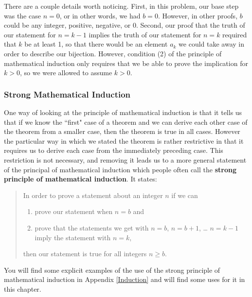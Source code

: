 There are a couple details worth noticing.  First, in this problem, our
base step was the case $n=0$, or in other words, we had $b=0$.  However,
in other proofs,
$b$ could be any integer, positive, negative, or 0.  Second, our proof
that the truth of our statement for $n=k-1$ implies the truth of our
statement for
$n=k$ required that $k$ be at least 1, so that there would be an element
$a_k$ we could take away in order to describe our bijection.  However,
condition (2) of the principle of mathematical induction only requires
that we be able to prove the implication for $k>0$, so we were allowed to
assume $k>0$.

\subsubsection{Strong Mathematical Induction}
One way of looking at the principle of mathematical induction is that it
tells us that if we know the ``first" case of a theorem and we can derive
each other case of the theorem from a smaller case, then the theorem is
true in all cases.  However the particular way in which we stated the
theorem is rather restrictive in that it requires us to derive each
case from the immediately preceding case.  This restriction is
not necessary, and removing it leads us to a more general statement of
the principal of mathematical induction which people often call the {\bf
strong principle of mathematical induction}.  It states:
\begin{quote}In order to prove a
statement about an integer $n$ if we can
\begin{enumerate}
\item prove our statement when $n=b$ and
\item prove that the statements we get with $n=b$, $n=b+1$, \ldots
$n=k-1$ imply the statement with $n=k$,
\end{enumerate}
then our statement is true for all integers $n\ge b$.
\end{quote}
You will find some explicit examples of the use of the strong principle of
mathematical induction in Appendix \ref{Induction} and will find some uses for
it in this chapter.


